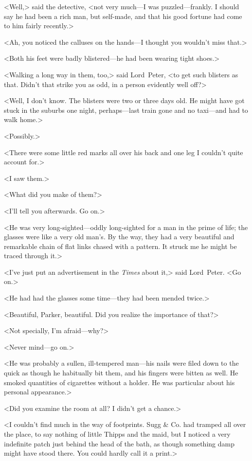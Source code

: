 <Well,> said the detective, <not very much—I was puzzled—frankly. I should say he had been a rich man, but self-made, and that his good fortune had come to him fairly recently.>

<Ah, you noticed the calluses on the hands—I thought you wouldn't miss that.>

<Both his feet were badly blistered—he had been wearing tight shoes.>

<Walking a long way in them, too,> said Lord~Peter, <to get such blisters as that. Didn't that strike you as odd, in a person evidently well off?>

<Well, I don't know. The blisters were two or three days old. He might have got stuck in the suburbs one night, perhaps—last train gone and no taxi—and had to walk home.>

<Possibly.>

<There were some little red marks all over his back and one leg I couldn't quite account for.>

<I saw them.>

<What did you make of them?>

<I'll tell you afterwards. Go on.>

<He was very long-sighted—oddly long-sighted for a man in the prime of life; the glasses were like a very old man's. By the way, they had a very beautiful and remarkable chain of flat links chased with a pattern. It struck me he might be traced through it.>

<I've just put an advertisement in the \textit{Times} about it,> said Lord~Peter. <Go on.>

<He had had the glasses some time—they had been mended twice.>

<Beautiful, Parker, beautiful. Did you realize the importance of that?>

<Not specially, I'm afraid—why?>

<Never mind—go on.>

<He was probably a sullen, ill-tempered man—his nails were filed down to the quick as though he habitually bit them, and his fingers were bitten as well. He smoked quantities of cigarettes without a holder. He was particular about his personal appearance.>

<Did you examine the room at all? I didn't get a chance.>

<I couldn't find much in the way of footprints. Sugg \& Co. had tramped all over the place, to say nothing of little Thipps and the maid, but I noticed a very indefinite patch just behind the head of the bath, as though something damp might have stood there. You could hardly call it a print.>

